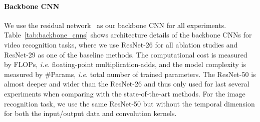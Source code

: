 \documentclass{article}
\begin{document}
\paragraph{Backbone CNN}
We use the residual network~\cite{he2016identity} as our backbone CNN for all experiments. Table~\ref{tab:backbone_cnns} shows architecture details of the backbone CNNs for  video recognition tasks, where we use {ResNet-26} for all ablation studies and {ResNet-29} as one of the baseline methods. The computational cost is measured by FLOPs, \emph{i.e.} floating-point multiplication-adds, and the model complexity is measured by \#Params, \emph{i.e.} total number of trained parameters. The {ResNet-50} is almost  deeper and wider than the {ResNet-26} and thus only  used for last several experiments when comparing with the state-of-the-art methods. For the image recognition task, we use the same {ResNet-50} but without the temporal dimension for both the input/output data and convolution kernels.

\begin{table*}[t]
  \tiny
  \centering
  \setlength\tabcolsep{3pt}
  \caption{Three backbone Residual Networks for the video tasks. The input size for ResNet-26 and ResNet-29 are 16112112, while the input size for ResNet-50 is 8224224. We follow~\cite{wang17non} and set  for ResNet-50 in last three stages and decrease the temporal size to reduce computational cost.}
  \label{tab:backbone_cnns}
\end{table*}
\end{document}
